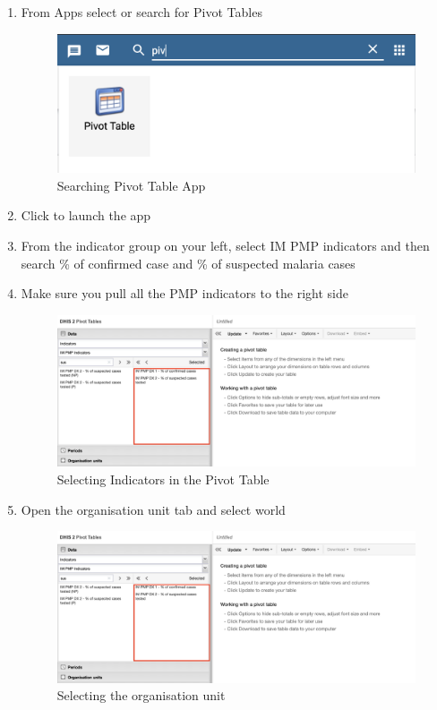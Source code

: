 \documentclass[]{book}
\begin{document}
\begin{enumerate}
\def\labelenumi{\arabic{enumi}.}
\setcounter{enumi}{1}
\item
  From Apps select or search for Pivot Tables

  \begin{figure}
  \includegraphics[width=15.36in]{./images/pivot-table} \caption{Searching Pivot Table App}\label{fig:pivot-table}
  \end{figure}
\item
  Click to launch the app
\item
  From the indicator group on your left, select IM PMP indicators and then search \% of confirmed case and \% of suspected malaria cases
\item
  Make sure you pull all the PMP indicators to the right side

  \begin{figure}
  \includegraphics[width=27.64in]{./images/pivot-table2} \caption{Selecting Indicators in the Pivot Table}\label{fig:pivot-table2}
  \end{figure}
\item
  Open the organisation unit tab and select world

  \begin{figure}
  \includegraphics[width=27.64in]{./images/pivot-table2} \caption{Selecting the organisation unit}\label{fig:pivot-table4}
  \end{figure}
\end{enumerate}
\end{document}
